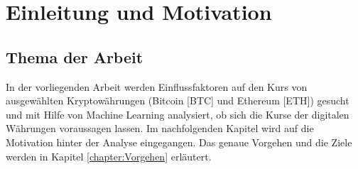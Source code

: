 \chapter{Einleitung und Motivation}\label{chap:motivation}

\section{Thema der Arbeit}\label{sec:thema}
In der vorliegenden Arbeit werden Einflussfaktoren auf den Kurs von ausgewählten Kryptowährungen (Bitcoin [BTC] und Ethereum [ETH]) gesucht und mit Hilfe von Machine Learning analysiert, ob sich die Kurse der digitalen Währungen voraussagen lassen. Im nachfolgenden Kapitel wird auf die Motivation hinter der Analyse eingegangen. Das genaue Vorgehen und die Ziele werden in Kapitel \ref{chapter:Vorgehen} erläutert.

